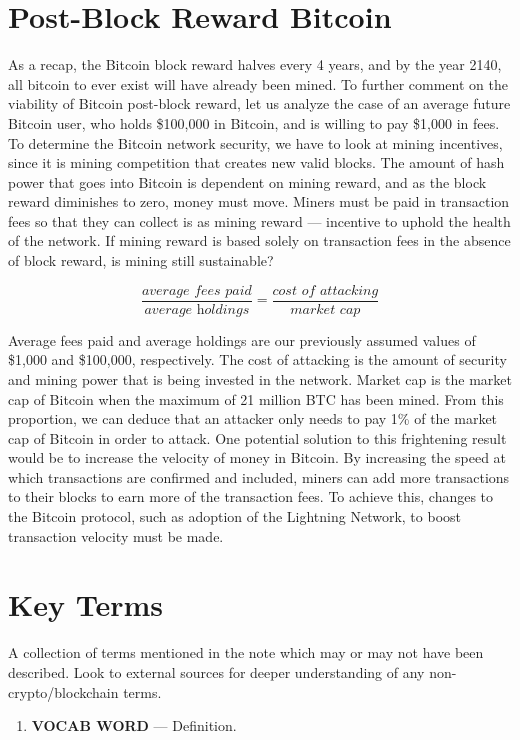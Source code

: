 \documentclass[full.tex]{subfiles}
\begin{document}
    \section*{Post-Block Reward Bitcoin}
    
    As a recap, the Bitcoin block reward halves every 4 years, and by the year 2140, all bitcoin to ever exist will have already been mined. To further comment on the viability of Bitcoin post-block reward, let us analyze the case of an average future Bitcoin user, who holds \$100,000 in Bitcoin, and is willing to pay \$1,000 in fees. To determine the Bitcoin network security, we have to look at mining incentives, since it is mining competition that creates new valid blocks. The amount of hash power that goes into Bitcoin is dependent on mining reward, and as the block reward diminishes to zero, money must move. Miners must be paid in transaction fees so that they can collect is as mining reward --- incentive to uphold the health of the network. If mining reward is based solely on transaction fees in the absence of block reward, is mining still sustainable? 
    
    $$\frac{\textit{average fees paid}}{\textit{average holdings}} = \frac{\textit{cost of attacking}}{\textit{market cap}}$$
    
    Average fees paid and average holdings are our previously assumed values of \$1,000 and \$100,000, respectively. The cost of attacking is the amount of security and mining power that is being invested in the network. Market cap is the market cap of Bitcoin when the maximum of 21 million BTC has been mined. From this proportion, we can deduce that an attacker only needs to pay 1\% of the market cap of Bitcoin in order to attack. One potential solution to this frightening result would be to increase the velocity of money in Bitcoin. By increasing the speed at which transactions are confirmed and included, miners can add more transactions to their blocks to earn more of the transaction fees. To achieve this, changes to the Bitcoin protocol, such as adoption of the Lightning Network, to boost transaction velocity must be made.
    
    
    
    
    
    \newpage
    \thispagestyle{firstpage}
    \vspace*{2\baselineskip}
    \section*{Key Terms}
    \noindent A collection of terms mentioned in the note which may or may not have been described. Look to external sources for deeper understanding of any non-crypto/blockchain terms.
    \begin{enumerate}
        \item \textbf{VOCAB WORD} --- Definition. %
    \end{enumerate}
\end{document}
